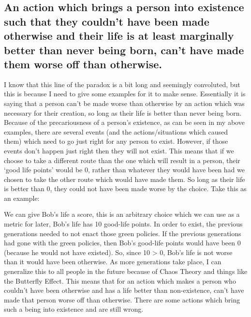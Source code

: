 \subsection{An action which brings a person into existence such that they couldn’t have been made otherwise and their life is at least marginally better than never being born, can’t have made them worse off than otherwise.}

I know that this line of the paradox is a bit long and seemingly convoluted, but this is because I need to give some examples for it to make sense. Essentially it is saying that a person can't be made worse than otherwise by an action which was necessary for their creation, so long as their life is better than never being born. Because of the precariousness of a person's existence, as can be seen in my above examples, there are several events (and the actions/situations which caused them) which need to go just right for any person to exist. However, if those events don't happen just right then they will not exist. This means that if we choose to take a different route than the one which will result in a person, their `good life points' would be 0, rather than whatever they would have been had we chosen to take the other route which would have made them. So long as their life is better than 0, they could not have been made worse by the choice. Take this as an example:

We can give Bob's life a score, this is an arbitrary choice which we can use as a metric for later, Bob's life has 10 good-life points. In order to exist, the previous generations needed to not enact those green policies. If the previous generations had gone with the green policies, then Bob's good-life points would have been 0 (because he would not have existed). So, since 10 > 0, Bob's life is not worse than it would have been otherwise. As more generations take place, I can generalize this to all people in the future because of Chaos Theory and things like the Butterfly Effect. This means that for an action which makes a person who couldn't have been otherwise and has a life better than non-existence, can't have made that person worse off than otherwise. 
There are some actions which bring such a being into existence and are still wrong.

